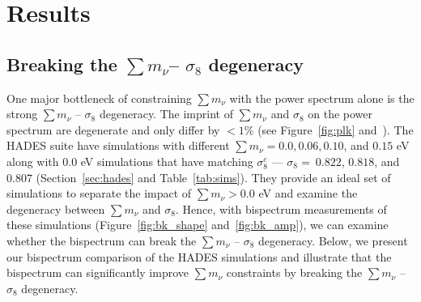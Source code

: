 \documentclass[12pt, letterpaper, preprint]{aastex62}
\newcommand{\smnu}{\sum m_\nu}
\newcommand{\sig}{\sigma_8}
\begin{document}

\section{Results} \label{sec:results} 
\subsection{Breaking the $\smnu$-- $\sig$ degeneracy} \label{sec:mnusig}
One major bottleneck of constraining $\smnu$ with the power spectrum alone is the 
strong $\smnu$ -- $\sig$ degeneracy. The imprint of $\smnu$ and $\sig$ on the power 
spectrum are degenerate and only differ by $< 1\%$ (see Figure~\ref{fig:plk} 
and~\citealt{villaescusa-navarro2018}). The HADES suite have simulations with 
different $\smnu = 0.0, 0.06, 0.10$, and $0.15$ eV along with $0.0$ eV simulations 
that have matching $\sig^{c}$ --- $\sig{=}~0.822$, $0.818$, and $0.807$ 
(Section~\ref{sec:hades} and Table~\ref{tab:sims}). They provide an ideal 
set of simulations to separate the impact of $\smnu > 0.0$ eV and examine 
the degeneracy between $\smnu$ and $\sig$. Hence, with bispectrum measurements 
of these simulations (Figure~\ref{fig:bk_shape} and~\ref{fig:bk_amp}), we 
can examine whether the bispectrum can break the $\smnu$ -- $\sig$ degeneracy. 
Below, we present our bispectrum comparison of the HADES simulations and 
illustrate that the bispectrum can significantly improve $\smnu$ constraints 
by breaking the $\smnu$ -- $\sig$ degeneracy. 
\end{document}

